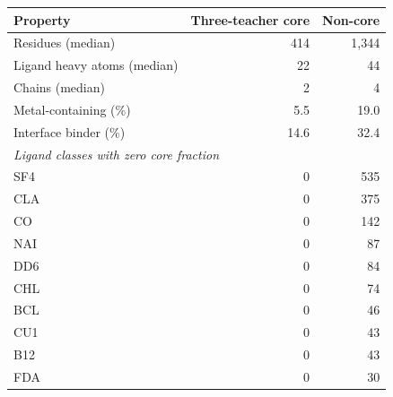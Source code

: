 \begin{tabular}{lrr}
\toprule
Property & Three-teacher core & Non-core \\
\midrule
Residues (median) & 414 & 1,344 \\
Ligand heavy atoms (median) & 22 & 44 \\
Chains (median) & 2 & 4 \\
Metal-containing (\%) & 5.5 & 19.0 \\
Interface binder (\%) & 14.6 & 32.4 \\
\midrule
\multicolumn{3}{l}{\emph{Ligand classes with zero core fraction}} \\
\quad SF4 & 0 & 535 \\
\quad CLA & 0 & 375 \\
\quad CO & 0 & 142 \\
\quad NAI & 0 & 87 \\
\quad DD6 & 0 & 84 \\
\quad CHL & 0 & 74 \\
\quad BCL & 0 & 46 \\
\quad CU1 & 0 & 43 \\
\quad B12 & 0 & 43 \\
\quad FDA & 0 & 30 \\
\bottomrule
\end{tabular}
